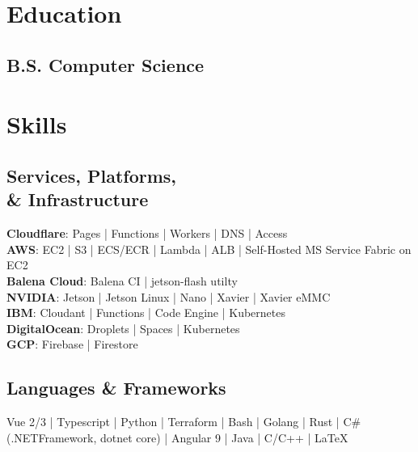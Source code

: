 \documentclass{deedy-resume-openfont}
\begin{document}
\begin{minipage}[t]{0.35\textwidth}
	
	\section{Education} 
	\subsection{B.S. Computer Science}
	\vspace{0.1\textwidth}
																																																																		
	\section{Skills}
	\subsection{Services, Platforms, \\ \& Infrastructure}
	\textbf{Cloudflare}: Pages | Functions | Workers | DNS | Access \\
	\vspace{0.025\textwidth}
	\textbf{AWS}: EC2 | S3 | ECS/ECR | Lambda | ALB | Self-Hosted MS Service Fabric on EC2 \\
	\vspace{0.025\textwidth}
	\textbf{Balena Cloud}: Balena CI | jetson-flash utilty \\
	\vspace{0.025\textwidth}
	\textbf{NVIDIA}: Jetson | Jetson Linux | Nano | Xavier | Xavier eMMC  \\
	\vspace{0.025\textwidth}
	\textbf{IBM}: Cloudant | Functions | Code Engine | Kubernetes \\
	\vspace{0.025\textwidth}
	\textbf{DigitalOcean}: Droplets | Spaces | Kubernetes \\
	\vspace{0.025\textwidth}
	\textbf{GCP}: Firebase | Firestore \\
	\vspace{0.025\textwidth}
	\sectionsep
	\sectionsep
																																																																		
	\subsection{Languages \& Frameworks}
	Vue 2/3 |
	Typescript | 
	Python | 
	Terraform | 
	Bash | 
	Golang | 
	Rust | 
	C\# (.NETFramework, dotnet core) | 
	Angular 9 | 
	Java | 
	C/C++ |  
	\LaTeX
	\sectionsep
	\sectionsep


\end{minipage}
\end{document}
